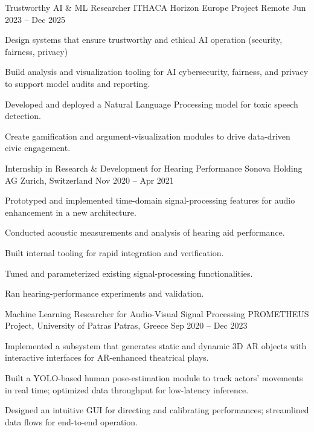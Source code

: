 \begin{cventries}
  \cventry
    {Trustworthy AI \& ML Researcher} %
    {ITHACA Horizon Europe Project} %
    {Remote} %
    {Jun 2023 -- Dec 2025} %
    {
      \begin{cvitems}
        \item {Design systems that ensure trustworthy and ethical AI operation (security, fairness, privacy)}
        \item {Build analysis and visualization tooling for AI cybersecurity, fairness, and privacy to support model audits and reporting.}
        \item {Developed and deployed a Natural Language Processing model for toxic speech detection.}
        \item {Create gamification and argument-visualization modules to drive data-driven civic engagement.}
      \end{cvitems}
    }

  \cventry
    {Internship in Research \& Development for Hearing Performance} %
    {Sonova Holding AG} %
    {Zurich, Switzerland} %
    {Nov 2020 -- Apr 2021} %
    {
      \begin{cvitems}
        \item {Prototyped and implemented time-domain signal-processing features for audio enhancement in a new architecture.}
        \item {Conducted acoustic measurements and analysis of hearing aid performance.}
        \item {Built internal tooling for rapid integration and verification.}
        \item {Tuned and parameterized existing signal-processing functionalities.}
        \item {Ran hearing-performance experiments and validation.}
      \end{cvitems}
    }

  \cventry
    {Machine Learning Researcher for Audio-Visual Signal Processing} %
    {PROMETHEUS Project, University of Patras} %
    {Patras, Greece} %
    {Sep 2020 -- Dec 2023} %
    {
      \begin{cvitems}
        \item {Implemented a subsystem that generates static and dynamic 3D AR objects with interactive interfaces for AR-enhanced theatrical plays.}
        \item {Built a YOLO-based human pose-estimation module to track actors' movements in real time; optimized data throughput for low-latency inference.}
        \item {Designed an intuitive GUI for directing and calibrating performances; streamlined data flows for end-to-end operation.}
      \end{cvitems}
    }

\end{cventries}
